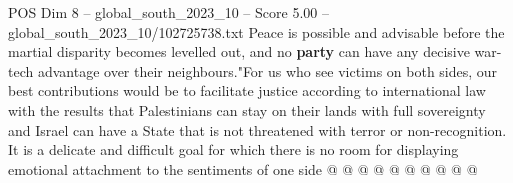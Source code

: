\begin{textsample}{POS Dim 8 – global\_south\_2023\_10 – Score 5.00 – global\_south\_2023\_10/102725738.txt}
Peace is possible and advisable before the martial disparity becomes levelled out, and no \textbf{party} can have any decisive war-tech advantage over their neighbours."For us who see victims on both sides, our best contributions would be to facilitate justice according to international law with the results that Palestinians can stay on their lands with full sovereignty and Israel can have a State that is not threatened with terror or non-recognition.
It is a delicate and difficult goal for which there is no room for displaying emotional attachment to the sentiments of one side @ @ @ @ @ @ @ @ @ @

\end{textsample}
